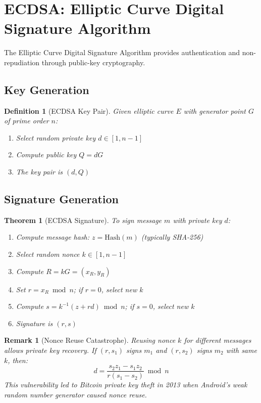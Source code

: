 \documentclass[a4paper, 11pt]{article}
\newtheorem{definition}{Definition}[section]
\newtheorem{theorem}{Theorem}[section]
\newtheorem{remark}{Remark}[section]
\begin{document}
\section{ECDSA: Elliptic Curve Digital Signature Algorithm}

The Elliptic Curve Digital Signature Algorithm provides authentication and non-repudiation through public-key cryptography.

\subsection{Key Generation}

\begin{definition}[ECDSA Key Pair]
Given elliptic curve $E$ with generator point $G$ of prime order $n$:
\begin{enumerate}
\item Select random private key $d \in [1, n-1]$
\item Compute public key $Q = dG$
\item The key pair is $(d, Q)$
\end{enumerate}
\end{definition}

\subsection{Signature Generation}

\begin{theorem}[ECDSA Signature]
To sign message $m$ with private key $d$:
\begin{enumerate}
\item Compute message hash: $z = \text{Hash}(m)$ (typically SHA-256)
\item Select random nonce $k \in [1, n-1]$
\item Compute $R = kG = (x_R, y_R)$
\item Set $r = x_R \bmod n$; if $r = 0$, select new $k$
\item Compute $s = k^{-1}(z + rd) \bmod n$; if $s = 0$, select new $k$
\item Signature is $(r, s)$
\end{enumerate}
\end{theorem}

\begin{remark}[Nonce Reuse Catastrophe]
Reusing nonce $k$ for different messages allows private key recovery. If $(r, s_1)$ signs $m_1$ and $(r, s_2)$ signs $m_2$ with same $k$, then:
\begin{equation}
d = \frac{s_2 z_1 - s_1 z_2}{r(s_1 - s_2)} \bmod n
\end{equation}
This vulnerability led to Bitcoin private key theft in 2013 when Android's weak random number generator caused nonce reuse.
\end{remark}
\end{document}
